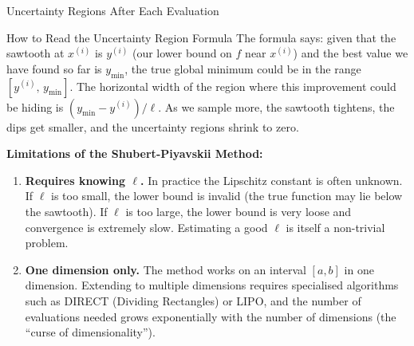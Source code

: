 \documentclass[aspectratio=169,10pt]{beamer}
\begin{document}
\begin{frame}[allowframebreaks]{Uncertainty Regions After Each Evaluation}
  \begin{alertblock}{How to Read the Uncertainty Region Formula}
    The formula says: given that the sawtooth at $x^{(i)}$ is $y^{(i)}$
    (our lower bound on $f$ near $x^{(i)}$) and the best value we have
    found so far is $y_{\min}$, the true global minimum could be in the
    range $[y^{(i)},\, y_{\min}]$.  The horizontal width of the region
    where this improvement could be hiding is $(y_{\min} - y^{(i)})/\ell$.
    As we sample more, the sawtooth tightens, the dips get smaller, and
    the uncertainty regions shrink to zero.
  \end{alertblock}

  \textbf{Limitations of the Shubert-Piyavskii Method:}
  \begin{enumerate}
    \item \textbf{Requires knowing $\ell$.}  In practice the Lipschitz constant
          is often unknown.  If $\ell$ is too small, the lower bound is invalid
          (the true function may lie below the sawtooth).  If $\ell$ is too
          large, the lower bound is very loose and convergence is extremely slow.
          Estimating a good $\ell$ is itself a non-trivial problem.
    \item \textbf{One dimension only.}  The method works on an interval $[a, b]$
          in one dimension.  Extending to multiple dimensions requires
          specialised algorithms such as DIRECT (Dividing Rectangles) or LIPO,
          and the number of evaluations needed grows exponentially with the
          number of dimensions (the ``curse of dimensionality'').
  \end{enumerate}

\end{frame}
\end{document}
